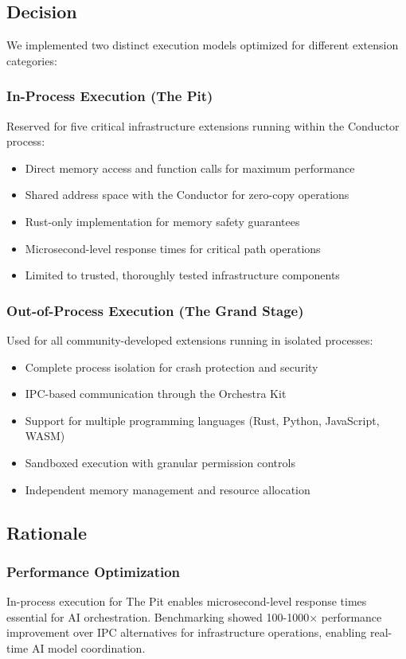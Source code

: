 \subsection*{Decision}

We implemented two distinct execution models optimized for different extension categories:

\subsubsection*{In-Process Execution (The Pit)}
Reserved for five critical infrastructure extensions running within the Conductor process:
\begin{itemize}
\item Direct memory access and function calls for maximum performance
\item Shared address space with the Conductor for zero-copy operations
\item Rust-only implementation for memory safety guarantees
\item Microsecond-level response times for critical path operations
\item Limited to trusted, thoroughly tested infrastructure components
\end{itemize}

\subsubsection*{Out-of-Process Execution (The Grand Stage)}
Used for all community-developed extensions running in isolated processes:
\begin{itemize}
\item Complete process isolation for crash protection and security
\item IPC-based communication through the Orchestra Kit
\item Support for multiple programming languages (Rust, Python, JavaScript, WASM)
\item Sandboxed execution with granular permission controls
\item Independent memory management and resource allocation
\end{itemize}

\subsection*{Rationale}

\subsubsection*{Performance Optimization}
In-process execution for The Pit enables microsecond-level response times essential for AI orchestration. Benchmarking showed 100-1000× performance improvement over IPC alternatives for infrastructure operations, enabling real-time AI model coordination.

